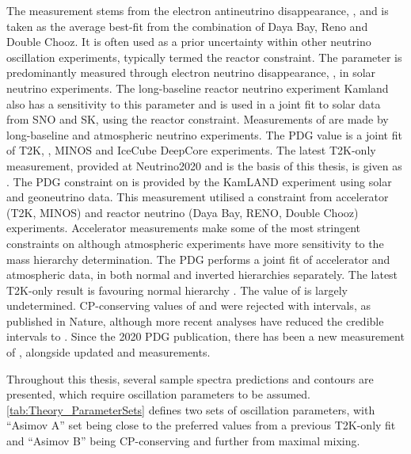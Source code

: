 The  measurement stems from the electron antineutrino disappearance, , and is taken as the  average best-fit from the combination of Daya Bay, Reno and Double Chooz. It is often used as a prior uncertainty within other neutrino oscillation experiments, typically termed the reactor constraint. The  parameter is predominantly measured through electron neutrino disappearance, , in solar neutrino experiments. The long-baseline reactor neutrino experiment Kamland also has a sensitivity to this parameter and is used in a joint fit to solar data from SNO and SK, using the reactor constraint. Measurements of  are made by long-baseline and atmospheric neutrino experiments. The PDG value is a joint fit of T2K, , MINOS and IceCube DeepCore experiments. The latest T2K-only measurement, provided at Neutrino2020 and is the basis of this thesis, is given as  \cite{Dunne2020-uf}. The PDG constraint on  is provided by the KamLAND experiment using solar and geoneutrino data. This measurement utilised a  constraint from accelerator (T2K, MINOS) and reactor neutrino (Daya Bay, RENO, Double Chooz) experiments. Accelerator measurements make some of the most stringent constraints on  although atmospheric experiments have more sensitivity to the mass hierarchy determination. The PDG performs a joint fit of accelerator and atmospheric data, in both normal and inverted hierarchies separately. The latest T2K-only result is  favouring normal hierarchy \cite{Dunne2020-uf}. The value of  is largely undetermined. CP-conserving values of  and \quickmath{\pi} were rejected with \quickmath{\sim 2\sigma} intervals, as published in Nature, although more recent analyses have reduced the credible intervals to . Since the 2020 PDG publication, there has been a new measurement of  \cite{Workman:2022ynf}, alongside updated  and  measurements.

Throughout this thesis, several sample spectra predictions and contours are presented, which require oscillation parameters to be assumed. \autoref{tab:Theory_ParameterSets} defines two sets of oscillation parameters, with ``Asimov A'' set being close to the preferred values from a previous T2K-only fit \cite{PhysRevLett.112.181801} and ``Asimov B'' being CP-conserving and further from maximal  mixing.

